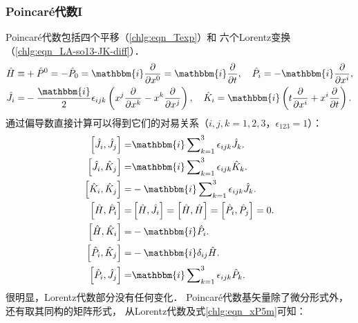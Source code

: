 \subsubsection{Poincar\'{e}代数I}\label{chlg:sec_PA-1}
Poincar\'{e}代数包括四个平移（\eqref{chlg:eqn_Texp}）和
六个Lorentz变换（\eqref{chlg:eqn_LA-so13-JK-diff}）．
\begin{subequations}\label{chlg:eqn_PA-gen}
    \begin{align}
        \hat{H} \equiv& +\hat{P}^0= -\hat{P}_0 = \mathbbm{i}\frac{\partial }{\partial x^0}
        = \mathbbm{i}\frac{\partial }{\partial t }, \quad
        \hat{P}_i = -\mathbbm{i}\frac{\partial }{\partial x^i} ,\\
        \hat{J}_i=& -\frac{\mathbbm{i}}{2}\epsilon_{ijk} \left(x^j\frac{\partial }{\partial x^k}
        - x^k\frac{\partial }{\partial x^j}\right), \quad
        \hat{K}_i= \mathbbm{i} \left(t\frac{\partial }{\partial x^i}+  x^i\frac{\partial }{\partial t}\right) .
    \end{align}
\end{subequations}
通过偏导数直接计算可以得到它们的对易关系（$i,j,k=1,2,3$，$\epsilon_{123}=1$）：
\begin{subequations}\label{chlg:eqn_PA-iso13-comm-PJK}
    \begin{align}
        \left[\hat{J}_i, \hat{J}_j \right] =& \mathbbm{i} \sum\nolimits_{k=1}^{3} \epsilon_{ijk} \hat{J}_k . \\
        \left[\hat{J}_i, \hat{K}_j\right] =& \mathbbm{i} \sum\nolimits_{k=1}^{3} \epsilon_{ijk} \hat{K}_k . \\
        \left[\hat{K}_i, \hat{K}_j\right] =& -\mathbbm{i}\sum\nolimits_{k=1}^{3} \epsilon_{ijk} \hat{J}_k . \\
        \left[\hat{H}, \hat{P}_i \right] =& \left[\hat{H}, \hat{J}_i \right]
        =\left[\hat{H}, \hat{H} \right] =\left[\hat{P}_i, \hat{P}_j \right] =0 . \\
        \left[\hat{H}, \hat{K}_i \right] = & -\mathbbm{i} \hat{P}_i .\\
        \left[\hat{P}_i, \hat{K}_j \right] =& -\mathbbm{i} \delta_{ij} \hat{H} . \\
        \left[\hat{P}_i, \hat{J}_j \right] =& \mathbbm{i} \sum\nolimits_{k=1}^{3} \epsilon_{ijk} \hat{P}_k .
    \end{align}
\end{subequations}
很明显，Lorentz代数部分没有任何变化．
Poincar\'{e}代数基矢量除了微分形式外，还有取其同构的矩阵形式，
从Lorentz代数及式\eqref{chlg:eqn_xP5m}可知：
